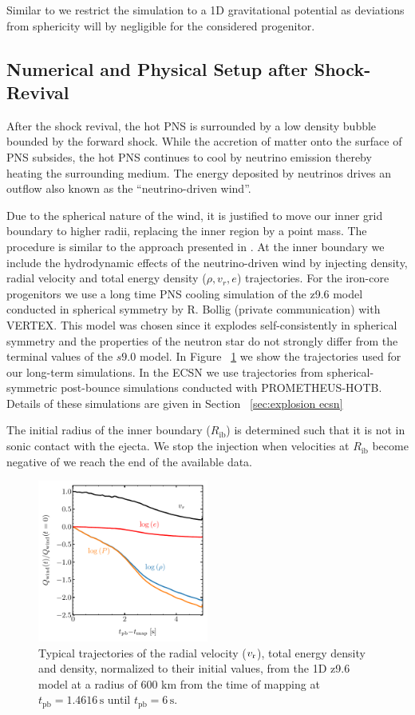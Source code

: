 \documentclass[fleqn,usenatbib]{mnras}
\newcommand{\prom}{\textsc{P{\footnotesize ROMETHEUS}-H{\footnotesize OT}B}\xspace}
\newcommand{\vertex}{\textsc{V{\footnotesize ERTEX}}\xspace}
\begin{document}
Similar to \cite{Gessner2018} we restrict the simulation to a 1D gravitational potential as deviations from sphericity will by negligible for the considered progenitor.

\subsection{Numerical and Physical Setup after Shock-Revival}
After the shock revival, the hot PNS is surrounded by a low density bubble bounded by the forward shock. While the accretion of matter onto the surface of PNS subsides, the hot PNS continues to cool by neutrino emission thereby heating the surrounding medium. The energy deposited by neutrinos drives an outflow also known as the ``neutrino-driven wind''. 

Due to the spherical nature of the wind, it is justified to move our inner grid boundary to higher radii, replacing the inner region by a point mass. The procedure is similar to the approach presented in \citet{Wongwathanarat2015,Mueller2018}. At the inner boundary we include the hydrodynamic effects of the neutrino-driven wind by injecting density, radial velocity and total energy density ($\rho,v_r,e$) trajectories. For the iron-core progenitors we use a long time PNS cooling simulation of the z9.6 model conducted in spherical symmetry by R. Bollig (private communication) with \vertex. This model was chosen since it explodes self-consistently in spherical symmetry and the properties of the neutron star do not strongly differ from the terminal values of the $s9.0$ model. In Figure ~\ref{fig:wind} we show the trajectories used for our long-term simulations.
In the ECSN we use trajectories from spherical-symmetric post-bounce simulations conducted with \prom. Details of these simulations are given in Section ~\ref{sec:explosion ecsn}

The initial radius of the inner boundary ($R_{\text{ib}}$) is determined such that it is not in sonic contact with the ejecta. We stop the injection when velocities at $R_{\text{ib}}$ become negative of we reach the end of the available data.

\begin{figure}
\label{fig:wind}
 \centering
 \includegraphics[width=0.50\textwidth]{./pic/wind.pdf}
 \caption{Typical trajectories of the radial velocity ($v_{\rm r}$), total energy density and  density, normalized to their initial values, from the 1D z9.6 model at a radius of 600 km from the time of mapping at $t_{\mathrm{pb}}= 1.4616\,\text{s}$ until $t_{\mathrm{pb}}= 6\,\text{s}$. }
\end{figure}
\end{document}
